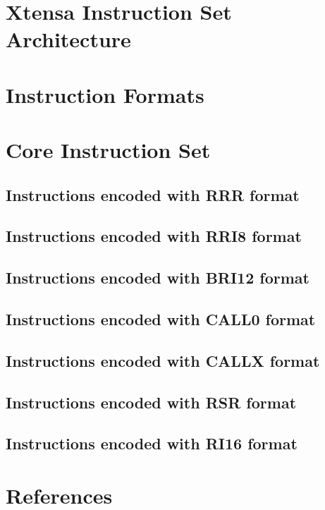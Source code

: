 \documentclass[oneside,11pt]{book}
\begin{document}
	
\chapter*{Xtensa Instruction Set Architecture}



\chapter*{Instruction Formats}



\chapter*{Core Instruction Set}

\section*{Instructions encoded with RRR format}

\section*{Instructions encoded with RRI8 format}

\section*{Instructions encoded with BRI12 format}

\section*{Instructions encoded with CALL0 format}

\section*{Instructions encoded with CALLX format}

\section*{Instructions encoded with RSR format}

\section*{Instructions encoded with RI16 format}


\chapter*{References}

\end{document}
